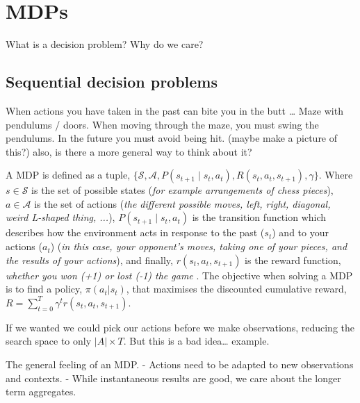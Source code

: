 \chapter{MDPs}

What is a decision problem?
Why do we care?

\hypertarget{sequential-decision-problems}{%
\section{Sequential decision
problems}\label{sequential-decision-problems}}

When actions you have taken in the past can bite you in the butt \ldots{}
Maze with pendulums / doors. When moving through the maze, you must
swing the pendulums. In the future you must avoid being hit. (maybe make
a picture of this?) also, is there a more general way to think about it?


A MDP is defined as a tuple, \(\{\mathcal S, \mathcal A, P(s_{t+1} \mid s_t, a_t),R(s_t, a_t, s_{t+1}), \gamma\}\)\footnotemark[1]. Where \(s \in \mathcal S\) is the set of possible states (\textit{for example arrangements of chess pieces}), \(a \in \mathcal A\) is the set of actions (\textit{the different possible moves, left, right, diagonal, weird L-shaped thing, ...}),  \(P(s_{t+1} \mid s_t, a_t)\) is the transition function which describes how the environment acts in response to the past (\(s_t\)) and to your actions (\(a_t\)) (\textit{in this case, your opponent's moves, taking one of your pieces, and the results of your actions}), and finally, \(r(s_t, a_t, s_{t+1})\) is the reward function, \textit{whether you won (+1) or lost (-1) the game }.
The objective when solving a MDP is to find a policy, $\pi(a_t | s_t)$, that maximises the discounted cumulative reward, \(R =\sum_{t=0}^T \gamma^t r(s_t, a_t, s_{t+1}) \).


If we wanted we could pick our actions before we make observations,
reducing the search space to only \(|A| \times T\). But this is a bad idea\ldots{} example.

The general feeling of an MDP. - Actions need to be adapted to new
observations and contexts. - While instantaneous results are good, we
care about the longer term aggregates.

